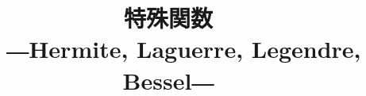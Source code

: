 \documentclass[../main]{subfiles}
\begin{document}
\renewcommand{\(}[0]{\left(}
\renewcommand{\)}[0]{\right)}
\renewcommand{\[}[0]{\left[}
\renewcommand{\]}[0]{\right]}


\renewcommand{\appendixname}{Appendix }


\newenvironment{ibox}[1]
{\vspace{4pt}\begin{itemsquarebox}[r]{\small {#1} } }
{\end{itemsquarebox}\vspace{4pt}}


\renewenvironment{proof}{\small \bf{[証明]} \normalfont \begin{quote} } {\qed \end{quote}}


\DeclareMathOperator*{\Res}{Res}


\def\since{%
\setlength{\unitlength}{.8pt}%
\thinlines %
\begin{picture}(12,12)%
\put(0 ,6){.}
\put(3,0){.}
\put(6,6){.}
\end{picture}%
}%



\makeatletter
  \renewcommand{\theequation}
  {\arabic{chapter}.\arabic{section}.\arabic{equation}}
 \makeatother

\setcounter{secnumdepth}{3}


\title{\HUGE 特殊関数\\　\Large
	―Hermite, Laguerre, Legendre, Bessel―}
\author{}
\date{}
\end{document}
